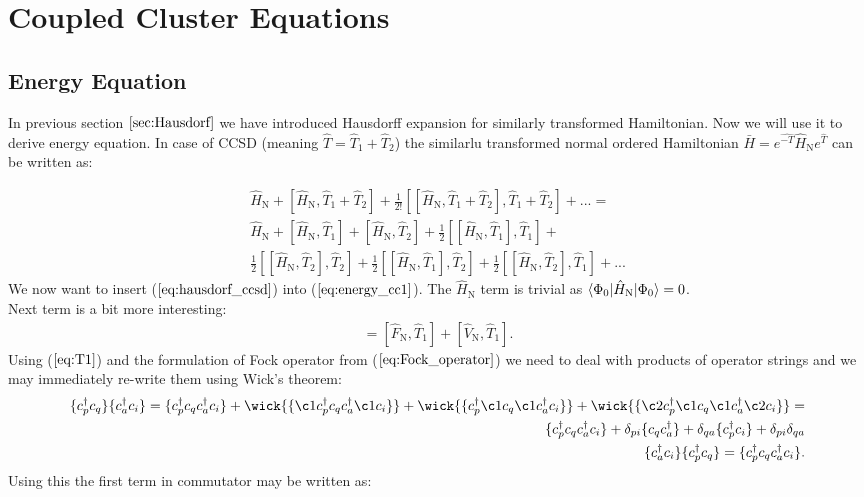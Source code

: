 \documentclass[twoside,english]{uiofysmaster}
\theoremstyle{definition}
\begin{document}
\section{Coupled Cluster Equations}
\subsection{Energy Equation}
In previous section $\ref{sec:Hausdorf}$ we have introduced Hausdorff expansion for similarly transformed Hamiltonian. Now we will use it to derive energy equation. In case of CCSD (meaning $\hat{T}=\hat{T}_1+\hat{T}_2$) the similarlu transformed normal ordered Hamiltonian $\bar{H}=e^{\hat{-T}} \hat{H}_\text{N} e^{\hat{T}}$ can be written as:

\begin{eqnarray}\label{eq:hausdorf_ccsd}
 \hat{H}_\text{N} + [\hat{H}_\text{N},\hat{T}_1+\hat{T}_2] + \frac{1}{2!}[[\hat{H}_\text{N},\hat{T}_1+\hat{T}_2],\hat{T}_1+\hat{T}_2] + ...= \nonumber\\
 \hat{H}_\text{N} + [\hat{H}_\text{N},\hat{T}_1] + [\hat{H}_\text{N},\hat{T}_2] + \frac{1}{2}[[\hat{H}_\text{N},\hat{T}_1],\hat{T}_1] +\nonumber\\ \frac{1}{2}[[\hat{H}_\text{N},\hat{T}_2],\hat{T}_2] +  \frac{1}{2}[[\hat{H}_\text{N},\hat{T}_1],\hat{T}_2] + \frac{1}{2}[[\hat{H}_\text{N},\hat{T}_2],\hat{T}_1] + ...
\end{eqnarray}
We now want to insert ($\ref{eq:hausdorf_ccsd}$) into ($\ref{eq:energy_cc1}$). The $\hat{H}_\text{N}$ term is trivial as $\braket{\Phi_0|\hat{H}_\text{N}|\Phi_0}=0$.\\
Next term is a bit more interesting:
\begin{eqnarray}
 [\hat{H}_\text{N},\hat{T}_1] =  [\hat{F}_\text{N},\hat{T}_1] +  [\hat{V}_\text{N},\hat{T}_1].
\end{eqnarray}
Using ($\ref{eq:T1}$) and the formulation of Fock operator from ($\ref{eq:Fock_operator}$) we need to deal with products of operator strings and we may immediately re-write them using Wick's theorem:
\begin{eqnarray}
\{c_p^\dagger c_q \}\{c_a^\dagger c_i \} =\{c_p^\dagger c_q c_a^\dagger c_i \} + \wick{ \{\c1 c_p^\dagger c_q c_a^\dagger \c1 c_i \} } + \wick{ \{ c_p^\dagger \c1 c_q \c1 c_a^\dagger  c_i \} } +
 \wick{ \{ \c2 c_p^\dagger \c1 c_q \c1 c_a^\dagger \c2  c_i \} } = \nonumber\\
 \{c_p^\dagger c_q c_a^\dagger c_i \} + \delta_{pi} \{ c_q c_a^\dagger\} +\delta_{qa} \{  c_p^\dagger c_i \} +  \delta_{pi}\delta_{qa}\\
 \{c_a^\dagger c_i \}\{c_p^\dagger c_q \}= \{c_p^\dagger c_q c_a^\dagger c_i \}.
\end{eqnarray}
Using this the first term in commutator may be written as:
\end{document}
